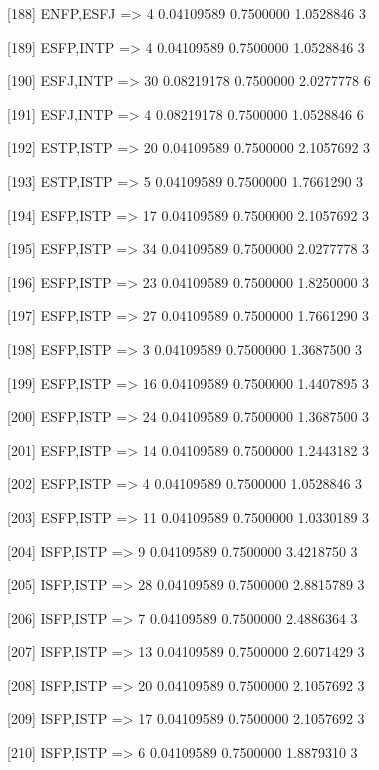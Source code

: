 [188] {ENFP,ESFJ}           => {4}  0.04109589 0.7500000  1.0528846  3   

[189] {ESFP,INTP}           => {4}  0.04109589 0.7500000  1.0528846  3   

[190] {ESFJ,INTP}           => {30} 0.08219178 0.7500000  2.0277778  6   

[191] {ESFJ,INTP}           => {4}  0.08219178 0.7500000  1.0528846  6   

[192] {ESTP,ISTP}           => {20} 0.04109589 0.7500000  2.1057692  3   

[193] {ESTP,ISTP}           => {5}  0.04109589 0.7500000  1.7661290  3   

[194] {ESFP,ISTP}           => {17} 0.04109589 0.7500000  2.1057692  3   

[195] {ESFP,ISTP}           => {34} 0.04109589 0.7500000  2.0277778  3   

[196] {ESFP,ISTP}           => {23} 0.04109589 0.7500000  1.8250000  3   

[197] {ESFP,ISTP}           => {27} 0.04109589 0.7500000  1.7661290  3   

[198] {ESFP,ISTP}           => {3}  0.04109589 0.7500000  1.3687500  3   

[199] {ESFP,ISTP}           => {16} 0.04109589 0.7500000  1.4407895  3   

[200] {ESFP,ISTP}           => {24} 0.04109589 0.7500000  1.3687500  3   

[201] {ESFP,ISTP}           => {14} 0.04109589 0.7500000  1.2443182  3   

[202] {ESFP,ISTP}           => {4}  0.04109589 0.7500000  1.0528846  3   

[203] {ESFP,ISTP}           => {11} 0.04109589 0.7500000  1.0330189  3   

[204] {ISFP,ISTP}           => {9}  0.04109589 0.7500000  3.4218750  3   

[205] {ISFP,ISTP}           => {28} 0.04109589 0.7500000  2.8815789  3   

[206] {ISFP,ISTP}           => {7}  0.04109589 0.7500000  2.4886364  3   

[207] {ISFP,ISTP}           => {13} 0.04109589 0.7500000  2.6071429  3   

[208] {ISFP,ISTP}           => {20} 0.04109589 0.7500000  2.1057692  3   

[209] {ISFP,ISTP}           => {17} 0.04109589 0.7500000  2.1057692  3   

[210] {ISFP,ISTP}           => {6}  0.04109589 0.7500000  1.8879310  3   


